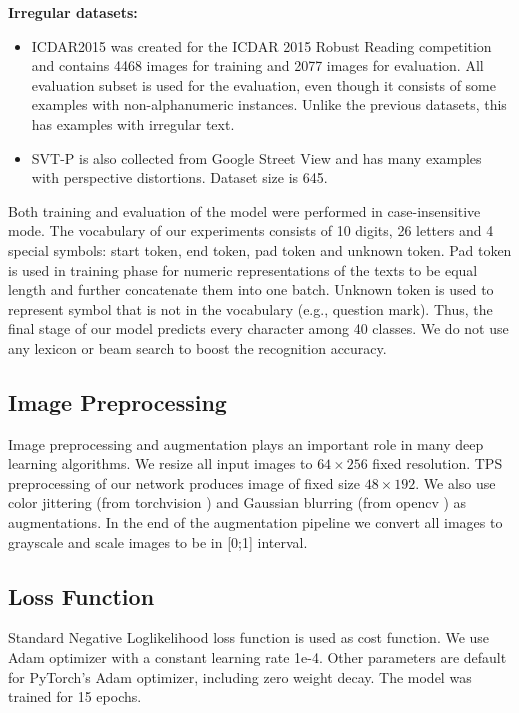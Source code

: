 \documentclass[runningheads]{llncs}
\begin{document}
\textbf{Irregular datasets:}
\begin{itemize}
  \item ICDAR2015 \cite{icdar15} was created for the ICDAR 2015 Robust Reading competition
        and contains 4468 images for training and 2077 images for evaluation. All evaluation subset
        is used for the evaluation, even though it consists of some examples with non-alphanumeric
        instances. Unlike the previous datasets, this has examples with irregular text.
  \item SVT-P \cite{svtp} is also collected from Google Street View and has many examples with
        perspective distortions. Dataset size is 645.
\end{itemize}


Both training and evaluation of the model were performed in case-insensitive mode. The vocabulary
of our experiments consists of 10 digits, 26 letters and 4 special symbols: start token,
end token, pad token and unknown token. Pad token is used in training phase for numeric
representations of the texts to be equal length and further concatenate them into one batch.
Unknown token is used to represent symbol that is not in the vocabulary (e.g., question mark).
Thus, the final stage of our model predicts every character among 40 classes.
We do not use any lexicon or beam search to boost the recognition accuracy.

\subsection{Image Preprocessing}
Image preprocessing and augmentation plays an important role in many deep learning algorithms.
We resize all input images to $64 \times 256$ fixed resolution. TPS preprocessing of our network
produces image of fixed size $48 \times 192$. We also use color jittering (from torchvision
\cite{torchvision}) and Gaussian blurring (from opencv \cite{opencv_library}) as augmentations.
In the end of the augmentation pipeline we convert all images to grayscale and scale
images to be in [0;1] interval.

\subsection{Loss Function}
Standard Negative Loglikelihood loss function is used as cost function. We use Adam
\cite{kingma2017adam} optimizer with a constant learning rate 1e-4. Other parameters are
default for PyTorch's Adam optimizer, including zero weight decay.
The model was trained for 15 epochs.
\end{document}
